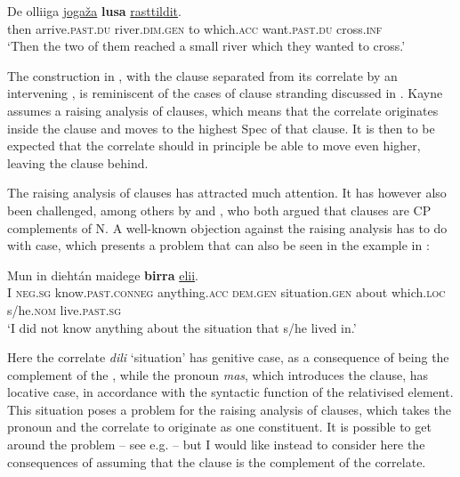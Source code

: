 \documentclass[output=paper]{LSP/langsci}
\begin{document}
\ea%
    \label{ex:julien:36}
   
    \gll    De    olliiga         \uline{jogaža}      \textbf{lusa}            \uline{rasttildit}. \\ 
then  arrive.\textsc{past.du}  river.\textsc{dim.gen}  to    which.\textsc{acc}  want.\textsc {past.du} cross\textsc{.inf}\\
    \glt ‘Then the two of them reached a small river which they wanted to cross.’
    \z


The construction in , with the  clause separated from its correlate by an intervening , is reminiscent of the cases of  clause stranding discussed in \citet{Kayne1994}. Kayne assumes a raising analysis of  clauses, which means that the correlate originates inside the  clause and moves to the highest Spec of that clause. It is then to be expected that the correlate should in principle be able to move even higher, leaving the  clause behind.

The raising analysis of  clauses has attracted much attention. It has however also been challenged, among others by \citet{Platzack2000} and \citet{Schmitt2000}, who both argued that  clauses are CP complements of N. A well-known objection against the raising analysis has to do with  case, which presents a problem that can also be seen in the  example in :


\ea%
    \label{ex:julien:37}
    \gll    Mun  in        diehtán            maidege                \textbf{birra}                \uline{elii}.\\ 
	  I    \textsc{neg.sg}    know.\textsc{past.conneg}    anything.\textsc{acc} \textsc{dem.gen}  situation.\textsc{gen}  about    which.\textsc{loc}  s/he.\textsc{nom}  live.\textsc{past.sg}\\
    \glt   ‘I did not know anything about the situation that s/he lived in.’
    \z


Here the correlate \textit{dili} ‘situation’ has genitive case, as a consequence of being the complement of the , while the  pronoun \textit{mas}, which introduces the  clause, has locative case, in accordance with the syntactic function of the relativised element. This situation poses a problem for the raising analysis of  clauses, which takes the  pronoun and the correlate to originate as one constituent. It is possible to get around the problem – see e.g. \citet{Bianchi2000} – but I would like instead to consider here the consequences of assuming that the  clause is the complement of the correlate.
\end{document}
